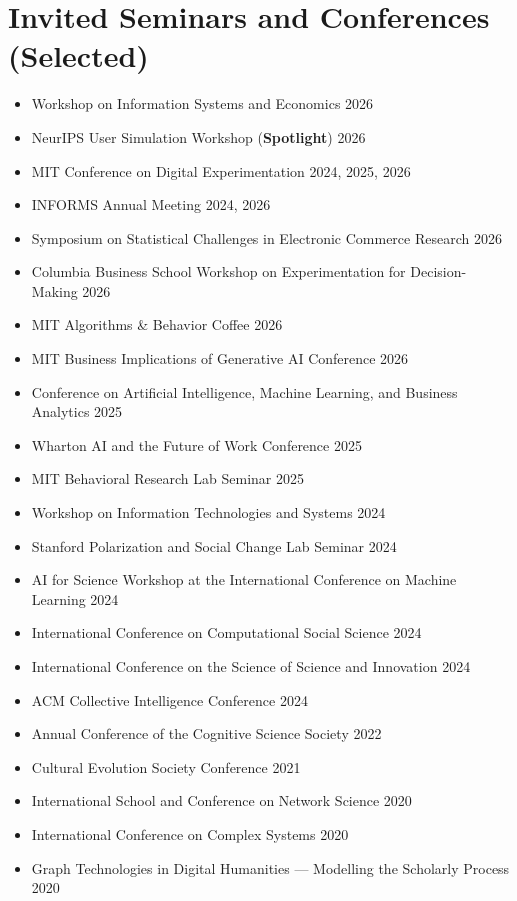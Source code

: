 \documentclass[11pt,a4paper,roman]{moderncv}        %
\begin{document}
\section{Invited Seminars and Conferences (Selected)}
    \small{
        \begin{itemize}
        \item[--] Workshop on Information Systems and Economics \hfill 2026
        \item[--] NeurIPS User Simulation Workshop (\textbf{Spotlight}) \hfill 2026
        \item[--] MIT Conference on Digital Experimentation \hfill 2024, 2025, 2026
        \item[--] INFORMS Annual Meeting \hfill 2024, 2026
        \item[--] Symposium on Statistical Challenges in Electronic Commerce Research \hfill 2026
        \item[--] Columbia Business School Workshop on Experimentation for Decision-Making \hfill 2026
        \item[--] MIT Algorithms \& Behavior Coffee \hfill 2026
        \item[--] MIT Business Implications of Generative AI Conference \hfill 2026
        \item[--] Conference on Artificial Intelligence, Machine Learning, and Business Analytics \hfill 2025
        \item[--] Wharton AI and the Future of Work Conference \hfill 2025
        \item[--] MIT Behavioral Research Lab Seminar \hfill 2025
        \item[--] Workshop on Information Technologies and Systems \hfill 2024
        \item[--] Stanford Polarization and Social Change Lab Seminar \hfill 2024
        \item[--] AI for Science Workshop at the International Conference on Machine Learning \hfill 2024
        \item[--] International Conference on Computational Social Science \hfill 2024
        \item[--] International Conference on the Science of Science and Innovation \hfill 2024
        \item[--] ACM Collective Intelligence Conference \hfill 2024
        \item[--] Annual Conference of the Cognitive Science Society \hfill 2022
    	\item[--] Cultural Evolution Society Conference \hfill 2021
          \item[--] International School and Conference on Network Science \hfill 2020
          \item[--] International Conference on Complex Systems \hfill 2020
          \item[--] Graph Technologies in Digital Humanities — Modelling the Scholarly Process \hfill 2020
    	\end{itemize}
    	}
\end{document}
